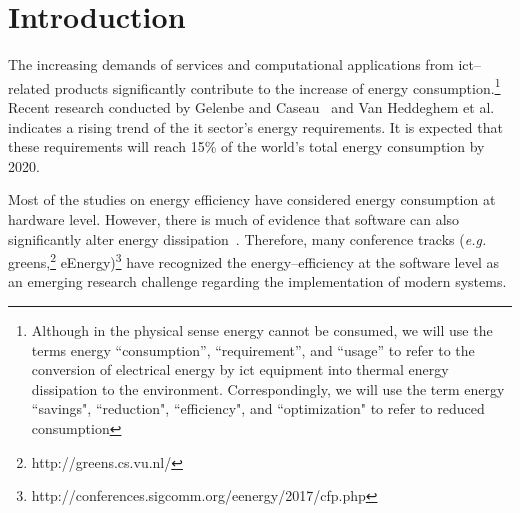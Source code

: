 \section{Introduction}
The increasing demands of services and computational applications 
from {\sc ict}--related products significantly contribute
to the increase of energy consumption.{\footnote{Although in the physical sense energy 
		cannot be consumed, we will use the terms energy ``consumption'', 
		``requirement'', and ``usage'' to refer to the conversion of 
		electrical energy by {\sc ict} equipment into thermal energy 
		dissipation to the environment. 
		Correspondingly, we will use the term energy ``savings", 
		``reduction", ``efficiency", and ``optimization" to refer 
		to reduced consumption}} 
Recent research conducted by Gelenbe and Caseau~ and 
Van Heddeghem et al.~ indicates a 
rising trend of the {\sc it} sector's energy requirements.
It is expected that these requirements will reach 15\% of the world's total energy consumption 
by 2020. 


Most of the studies on energy efficiency
have considered energy consumption at hardware level. 
However, there is much of evidence that software can also 
significantly alter energy dissipation~\cite{eder_energy_consumptions, 
capra_is_2012, ferreira_seflab_2013}. 
Therefore, many conference tracks (\textit{e.g.} {\sc greens},\footnote{http://greens.cs.vu.nl/} 
eEnergy)\footnote{http://conferences.sigcomm.org/eenergy/2017/cfp.php}
have recognized the energy--efficiency at the software level
as an emerging research challenge
regarding the implementation of modern systems.



